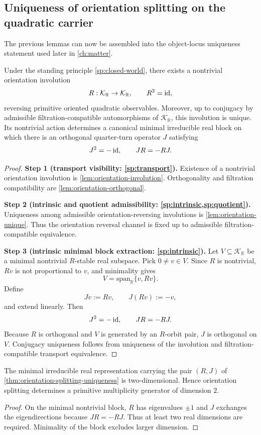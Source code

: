 \subsection{Uniqueness of orientation splitting on the quadratic carrier}
\label{sec:orientation-unique}
The previous lemmas can now be assembled into the object-locus
uniqueness statement used later in \cref{ch:matter}.
\begin{theorem}
\label{thm:orientation-splitting-uniqueness}
Under the standing principle \cref{sp:closed-world}, there exists a
nontrivial orientation involution
\[
	R:\mathcal K_{\mathbb R}\to \mathcal K_{\mathbb R},
	\qquad
	R^2=\operatorname{id},
\]
reversing primitive oriented quadratic observables.
Moreover, up to conjugacy by admissible filtration-compatible
automorphisms of \(\mathcal K_{\mathbb R}\), this involution is unique.
Its nontrivial action determines a canonical minimal irreducible real
block on which there is an orthogonal quarter-turn operator
\(J\) satisfying
\[
	J^2=-\operatorname{id},
	\qquad
	JR=-RJ.
\]
\end{theorem}
\begin{proof}
	\textbf{Step 1 (transport visibility: \cref{sp:transport}).}
	Existence of a nontrivial orientation involution is
	\cref{lem:orientation-involution}.
	Orthogonality and filtration compatibility are
	\cref{lem:orientation-orthogonal}.

	\textbf{Step 2 (intrinsic and quotient admissibility:
	\cref{sp:intrinsic,sp:quotient}).}
	Uniqueness among admissible orientation-reversing involutions is
	\cref{lem:orientation-unique}.
	Thus the orientation reversal channel is fixed up to admissible
	filtration-compatible equivalence.

	\textbf{Step 3 (intrinsic minimal block extraction:
	\cref{sp:intrinsic}).}
	Let \(V\subseteq\mathcal K_{\mathbb R}\) be a minimal nontrivial
	\(R\)-stable real subspace.
	Pick \(0\neq v\in V\).
	Since \(R\) is nontrivial, \(Rv\) is not proportional to \(v\), and
	minimality gives
	\[
		V=\mathrm{span}_{\mathbb R}\{v,Rv\}.
	\]
	Define
	\[
		Jv:=Rv,
		\qquad
		J(Rv):=-v,
	\]
	and extend linearly.
	Then
	\[
		J^2=-\operatorname{id},
		\qquad
		JR=-RJ.
	\]
	Because \(R\) is orthogonal and \(V\) is generated by an
	\(R\)-orbit pair, \(J\) is orthogonal on \(V\).
	Conjugacy uniqueness follows from uniqueness of the involution and
	filtration-compatible transport equivalence.
\end{proof}
\begin{corollary}
\label{cor:orientation-primitive-doublet}
The minimal irreducible real representation carrying the pair
\((R,J)\) of \cref{thm:orientation-splitting-uniqueness} is
two-dimensional.
Hence orientation splitting determines a primitive multiplicity generator
of dimension \(2\).
\end{corollary}
\begin{proof}
On the minimal nontrivial block, \(R\) has eigenvalues \(\pm1\) and
\(J\) exchanges the eigendirections because \(JR=-RJ\).
Thus at least two real dimensions are required.
Minimality of the block excludes larger dimension.
\end{proof}
